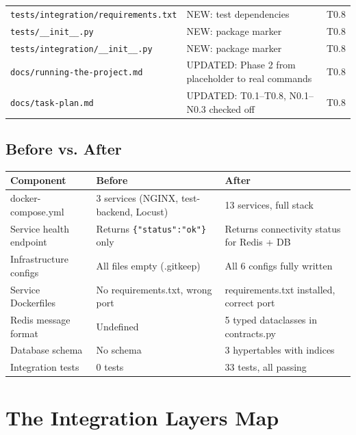 \documentclass[12pt, a4paper]{article}
\begin{document}
\begin{center}
\begin{tabularx}{\textwidth}{lXl}
  \texttt{tests/integration/requirements.txt}        & NEW: test dependencies & T0.8 \\
  \texttt{tests/\_\_init\_\_.py}                       & NEW: package marker & T0.8 \\
  \texttt{tests/integration/\_\_init\_\_.py}           & NEW: package marker & T0.8 \\
  \midrule
  \texttt{docs/running-the-project.md} & UPDATED: Phase 2 from placeholder to real commands & T0.8 \\
  \texttt{docs/task-plan.md} & UPDATED: T0.1–T0.8, N0.1–N0.3 checked off & T0.8 \\
  \bottomrule
\end{tabularx}
\end{center}

\subsection{Before vs. After}

\begin{center}
\begin{tabularx}{\textwidth}{lXX}
  \toprule
  \textbf{Component} & \textbf{Before} & \textbf{After} \\
  \midrule
  docker-compose.yml & 3 services (NGINX, test-backend, Locust) & 13 services, full stack \\
  Service health endpoint & Returns \texttt{\{"status":"ok"\}} only & Returns connectivity status for Redis + DB \\
  Infrastructure configs & All files empty (.gitkeep) & All 6 configs fully written \\
  Service Dockerfiles & No requirements.txt, wrong port & requirements.txt installed, correct port \\
  Redis message format & Undefined & 5 typed dataclasses in contracts.py \\
  Database schema & No schema & 3 hypertables with indices \\
  Integration tests & 0 tests & 33 tests, all passing \\
  \bottomrule
\end{tabularx}
\end{center}

\section{The Integration Layers Map}
\end{document}
